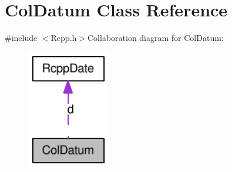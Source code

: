 \hypertarget{classColDatum}{
\section{ColDatum Class Reference}
\label{classColDatum}
}


{\ttfamily \#include $<$Rcpp.h$>$}Collaboration diagram for ColDatum:\nopagebreak
\begin{figure}[H]
\begin{center}
\leavevmode
\includegraphics[width=102pt]{classColDatum__coll__graph}
\end{center}
\end{figure}

